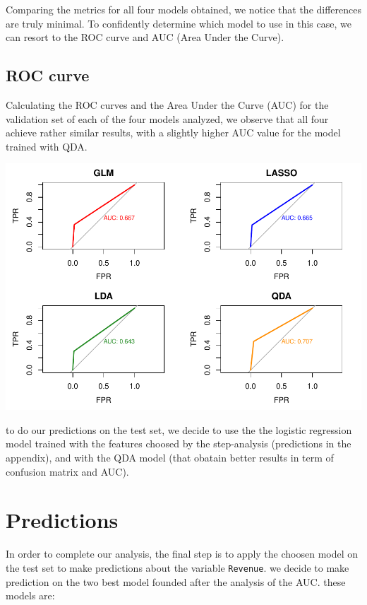 \documentclass[
]{article}
\begin{document}
Comparing the metrics for all four models obtained, we notice that the
differences are truly minimal. To confidently determine which model to
use in this case, we can resort to the ROC curve and AUC (Area Under the
Curve).

\newpage

\subsection{ROC curve}\label{roc-curve}

Calculating the ROC curves and the Area Under the Curve (AUC) for the
validation set of each of the four models analyzed, we observe that all
four achieve rather similar results, with a slightly higher AUC value
for the model trained with QDA.

\includegraphics{report_official_files/figure-latex/unnamed-chunk-19-1.pdf}

to do our predictions on the test set, we decide to use the the logistic
regression model trained with the features choosed by the step-analysis
(predictions in the appendix), and with the QDA model (that obatain
better results in term of confusion matrix and AUC).

\newpage

\section{Predictions}\label{predictions}

In order to complete our analysis, the final step is to apply the
choosen model on the test set to make predictions about the variable
\texttt{Revenue}. we decide to make prediction on the two best model
founded after the analysis of the AUC. these models are:
\end{document}
